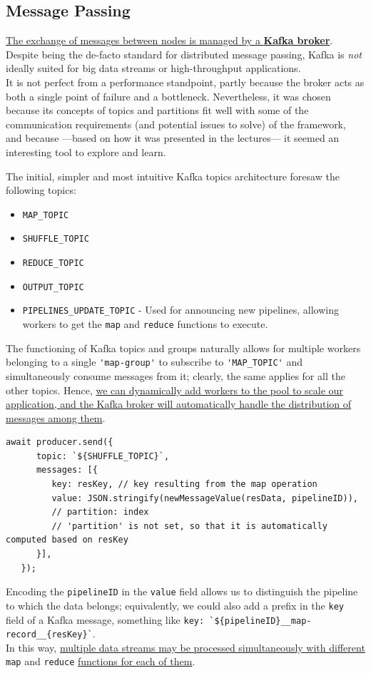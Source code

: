 \subsection{Message Passing}
\ul{The exchange of messages between nodes is managed by a \textbf{Kafka broker}}. 
Despite being the de-facto standard for distributed message passing, Kafka is \textit{not} ideally suited for big data streams or high-throughput applications.\\
It is not perfect from a performance standpoint, partly because the broker acts as both a single point of failure and a bottleneck. Nevertheless, it was chosen because its concepts of topics and partitions fit well with some of the communication requirements (and potential issues to solve) of the framework, and because ---based on how it was presented in the lectures--- it seemed an interesting tool to explore and learn.

{The initial, simpler and most intuitive Kafka topics architecture foresaw the following topics:\ns
\begin{itemize}
   \label{enum:simplerTopics}
   \item \lstinline|MAP_TOPIC|
   \item \lstinline|SHUFFLE_TOPIC|
   \item \lstinline|REDUCE_TOPIC|
   \item \lstinline|OUTPUT_TOPIC|
   \item \lstinline|PIPELINES_UPDATE_TOPIC| - Used for announcing new pipelines, allowing workers to get the \lstinline|map| and \lstinline|reduce| functions to execute.
\end{itemize}}

The functioning of Kafka topics and groups naturally allows for multiple workers belonging to a single \lstinline|'map-group'| to subscribe to \lstinline|'MAP_TOPIC'| and simultaneously consume messages from it; clearly, the same applies for all the other topics. 
Hence, \ul{we can dynamically add workers to the pool to scale our application, and the Kafka broker will automatically handle the distribution of messages among them}.

\begin{lstlisting}[caption={Sending MAP record to shuffle topic},label={lst:sendingMapRecord}]
   await producer.send({
      topic: `${SHUFFLE_TOPIC}`,
      messages: [{
         key: resKey, // key resulting from the map operation
         value: JSON.stringify(newMessageValue(resData, pipelineID)),
         // partition: index
         // 'partition' is not set, so that it is automatically computed based on resKey 
      }],
   });
\end{lstlisting}
Encoding the \lstinline|pipelineID| in the \lstinline|value| field allows us to distinguish the pipeline to which the data belongs; equivalently, we could also add a prefix in the \texttt{key} field of a Kafka message, something like \lstinline|key: `${pipelineID}__map-record__{resKey}`|.\\
In this way, \ul{multiple data streams may be processed simultaneously with different} \lstinline|map| and \lstinline|reduce| \ul{functions for each of them}.

